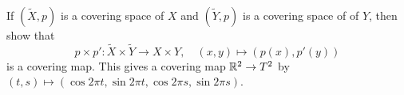 \begin{exercise}
  If $(\widetilde{X}, p)$ is a covering space of $X$
  and $(\widetilde{Y}, p)$ is a covering space of of $Y$,
  then show that
  \[
    p \times p' : \widetilde{X} \times \widetilde{Y} \to X \times Y, \quad
    (x, y) \mapsto (p(x), p'(y))
  \]
  is a covering map. This gives a covering
  map $\mathbb{R}^2 \to T^2$ by
  $(t, s) \mapsto (\cos 2\pi t, \sin 2\pi t, \cos 2\pi s, \sin 2\pi s)$.
\end{exercise}
